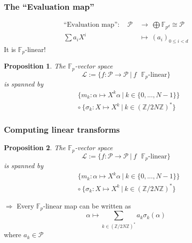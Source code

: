 \documentclass{beamer}
\newcommand{\Z}{\mathbb{Z}}
\newcommand{\F}{\mathbb{F}}
\newtheorem{prop}{Proposition}
\begin{document}
\begin{frame}
    \frametitle{The ``Evaluation map''}
    \begin{align*}
        \text{``Evaluation map''}: \quad \mathcal{P} \ &\to \ \bigoplus \F_{p^d} \cong \mathcal{P} \\ 
        \sum a_i X^i \ &\mapsto \ (a_i)_{0 \leq i < d}
    \end{align*}
    It is $\F_p$-linear!
    \begin{prop}
        The $\F_p$-vector space
        \begin{equation*}
            \mathcal{L} := \{ f: \mathcal{P} \to \mathcal{P} \ | \ \text{$f$ $\F_p$-linear}\}
        \end{equation*}
        is spanned by
        \begin{align*}
            &\{ m_k: \alpha \mapsto X^k \alpha \ | \ k \in \{ 0, ..., N - 1\} \} \\
            &\circ \ \{ \sigma_k: X \mapsto X^k \ | \ k \in (\Z/2N\Z)^* \}
        \end{align*}
    \end{prop}
\end{frame}

\begin{frame}
    \frametitle{Computing linear transforms}
    
    \begin{prop}
        The $\F_p$-vector space
        \begin{equation*}
            \mathcal{L} := \{ f: \mathcal{P} \to \mathcal{P} \ | \ \text{$f$ $\F_p$-linear}\}
        \end{equation*}
        is spanned by
        \begin{align*}
            &\{ m_k: \alpha \mapsto X^k \alpha \ | \ k \in \{ 0, ..., N - 1\} \} \\
            &\circ \ \{ \sigma_k: X \mapsto X^k \ | \ k \in (\Z/2N\Z)^* \}
        \end{align*}
    \end{prop}
    $\Rightarrow$ Every $\F_p$-linear map can be written as
    \begin{equation*}
        \alpha \mapsto \sum_{k \in (\Z/2N\Z)^*} a_k \sigma_k(\alpha)
    \end{equation*}
    where $a_k \in \mathcal{P}$
\end{frame}
\end{document}
